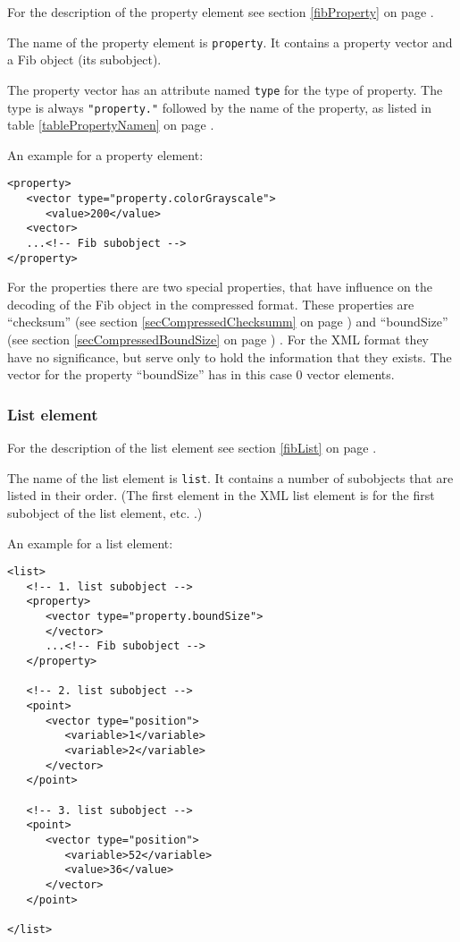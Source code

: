 For the description of the property element see section \ref{fibProperty} on page \pageref{fibProperty} .

The name of the property element is \verb|property|. It contains a property vector and a Fib object (its subobject).

The property vector has an attribute named \verb|type| for the type of property. The type is always \verb|"property."| followed by the name of the property, as listed in table \ref{tablePropertyNamen} on page \pageref{tablePropertyNamen} .

\bigskip\noindent
An example for a property element:
\begin{verbatim}
<property>
   <vector type="property.colorGrayscale">
      <value>200</value>
   <vector>
   ...<!-- Fib subobject -->
</property>
\end{verbatim}

\bigskip\noindent
For the properties there are two special properties, that have influence on the decoding of the Fib object in the compressed format. These properties are ``checksum'' (see section \ref{secCompressedChecksumm} on page \pageref{secCompressedChecksumm}) and ``boundSize'' (see section \ref{secCompressedBoundSize} on page \pageref{secCompressedBoundSize}) .
For the XML format they have no significance, but serve only to hold the information that they exists. The vector for the property ``boundSize'' has in this case $0$ vector elements.




\subsubsection{List element}

For the description of the list element see section \ref{fibList} on page \pageref{fibList} .

The name of the list element is \verb|list|. It contains a number of subobjects that are listed in their order. (The first element in the XML list element is for the first subobject of the list element, etc. .)

\bigskip\noindent
An example for a list element:
\begin{verbatim}
<list>
   <!-- 1. list subobject -->
   <property>
      <vector type="property.boundSize">
      </vector>
      ...<!-- Fib subobject -->
   </property>

   <!-- 2. list subobject -->
   <point>
      <vector type="position">
         <variable>1</variable>
         <variable>2</variable>
      </vector>
   </point>

   <!-- 3. list subobject -->
   <point>
      <vector type="position">
         <variable>52</variable>
         <value>36</value>
      </vector>
   </point>

</list>
\end{verbatim}


